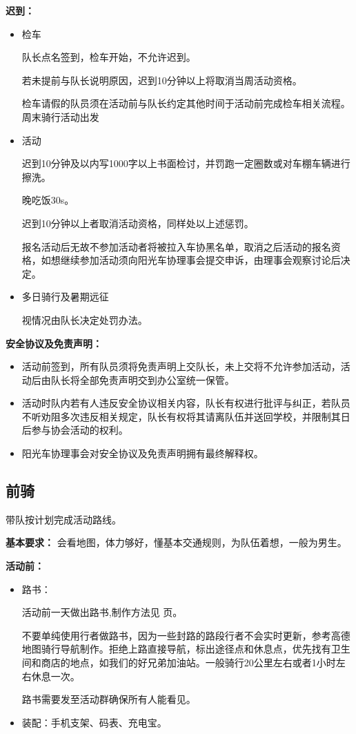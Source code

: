 \documentclass{ctexbook}
\begin{document}
\textbf{迟到：}

\begin{itemize}
\item 检车

    队长点名签到，检车开始，不允许迟到。

    若未提前与队长说明原因，迟到10分钟以上将取消当周活动资格。

    检车请假的队员须在活动前与队长约定其他时间于活动前完成检车相关流程。
周末骑行活动出发

\item 活动

    迟到10分钟及以内写1000字以上书面检讨，并罚跑一定圈数或对车棚车辆进行擦洗。

    晚吃饭30s。

    迟到10分钟以上者取消活动资格，同样处以上述惩罚。

    报名活动后无故不参加活动者将被拉入车协黑名单，取消之后活动的报名资格，如想继续参加活动须向阳光车协理事会提交申诉，由理事会观察讨论后决定。
\item 多日骑行及暑期远征

视情况由队长决定处罚办法。

\end{itemize}

\textbf{安全协议及免责声明：}

\begin{itemize}
\item 活动前签到，所有队员须将免责声明上交队长，未上交将不允许参加活动，活动后由队长将全部免责声明交到办公室统一保管。

\item 活动时队内若有人违反安全协议相关内容，队长有权进行批评与纠正，若队员不听劝阻多次违反相关规定，队长有权将其请离队伍并送回学校，并限制其日后参与协会活动的权利。

\item 阳光车协理事会对安全协议及免责声明拥有最终解释权。
\end{itemize}


\subsection{前骑}

带队按计划完成活动路线。

\textbf{基本要求：}
会看地图，体力够好，懂基本交通规则，为队伍着想，一般为男生。

\textbf{活动前：}
\begin{itemize}

\item 路书：

活动前一天做出路书,制作方法见 \pageref{chapter：路书制作方法} 页。

不要单纯使用行者做路书，因为一些封路的路段行者不会实时更新，参考高德地图骑行导航制作。拒绝上路直接导航，标出途径点和休息点，优先找有卫生间和商店的地点，如我们的好兄弟加油站。一般骑行20公里左右或者1小时左右休息一次。

路书需要发至活动群确保所有人能看见。

\item 装配：手机支架、码表、充电宝。

\end{itemize}
\end{document}
